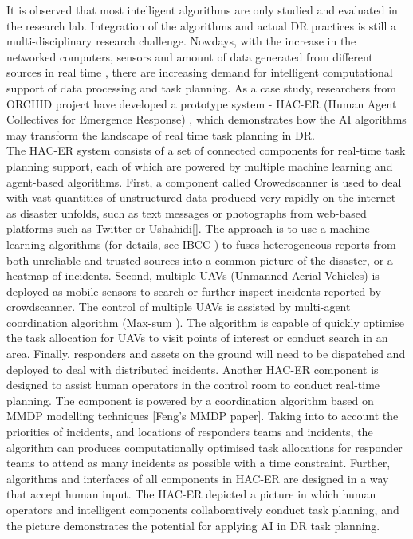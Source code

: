 It is observed that most intelligent algorithms are only studied and evaluated in the research lab. Integration of the algorithms and actual DR practices is still a multi-disciplinary research challenge. Nowdays, with the increase in the networked computers, sensors and amount of data generated from different sources in real time \cite{Ramchurn}, there are increasing demand for intelligent computational support of data processing and task planning. As a case study, researchers from ORCHID project have developed a prototype system - HAC-ER (Human Agent Collectives for Emergence Response) \cite{Jennings2014,Ramchurn2015,Ramchurn2015a}, which demonstrates how the AI algorithms may transform the landscape of real time task planning in DR.\\

The HAC-ER system consists of a set of connected components for real-time task planning support, each of which are powered by multiple machine learning and agent-based algorithms. First, a component called Crowedscanner is used to deal with vast quantities of unstructured data produced very rapidly on the internet as disaster unfolds, such as text messages or photographs from web-based platforms such as Twitter or Ushahidi[]. The approach is to use a machine learning algorithms (for details, see IBCC \cite{Simpson}) to fuses heterogeneous reports from both unreliable and trusted sources into a common picture of the disaster, or a heatmap of incidents. Second, multiple  UAVs (Unmanned Aerial Vehicles) is deployed as mobile sensors to search or further inspect incidents reported by crowdscanner. The control of multiple UAVs is assisted by multi-agent coordination algorithm (Max-sum \cite{Ramchurn2010}). The algorithm is capable of quickly optimise the task allocation for UAVs to visit points of interest or conduct search in an area.  Finally, responders and assets on the ground will need to be dispatched and deployed to deal with distributed incidents. Another HAC-ER component is designed to assist human operators in the control room to conduct real-time planning. The component is powered by a coordination algorithm based on MMDP modelling techniques [Feng's MMDP paper]. Taking into to account the priorities of incidents, and locations of responders teams and incidents, the algorithm can produces computationally optimised task allocations for responder teams to attend as many incidents as possible with a time constraint. Further, algorithms and interfaces of all components in HAC-ER are designed in a way that accept human input. The HAC-ER depicted a picture in which human operators and intelligent components collaboratively conduct task planning, and the picture demonstrates the potential for applying AI in DR task planning.\\

